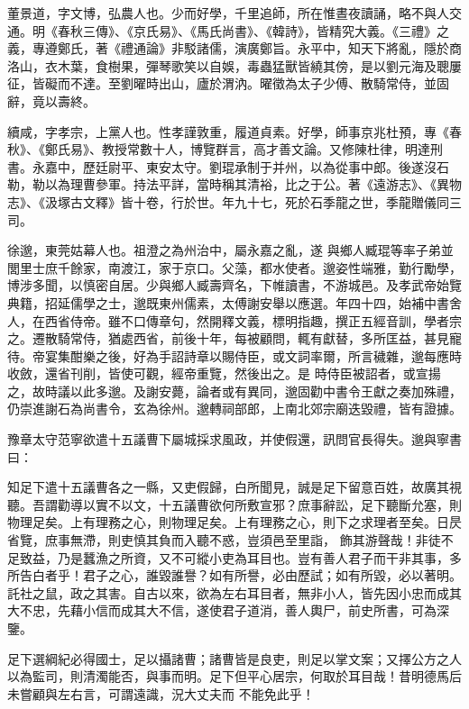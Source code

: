 \begin{pinyinscope}
 董景道，字文博，弘農人也。少而好學，千里追師，所在惟晝夜讀誦，略不與人交通。明《春秋三傳》、《京氏易》、《馬氏尚書》、《韓詩》，皆精究大義。《三禮》之義，專遵鄭氏，著《禮通論》非駁諸儒，演廣鄭旨。永平中，知天下將亂，隱於商洛山，衣木葉，食樹果，彈琴歌笑以自娛，毒蟲猛獸皆繞其傍，是以劉元海及聰屢征，皆礙而不達。至劉曜時出山，廬於渭汭。曜徵為太子少傅、散騎常侍，並固辭，竟以壽終。



 續咸，字孝宗，上黨人也。性孝謹敦重，履道貞素。好學，師事京兆杜預，專《春秋》、《鄭氏易》、教授常數十人，博覽群言，高才善文論。又修陳杜律，明達刑書。永嘉中，歷廷尉平、東安太守。劉琨承制于并州，以為從事中郎。後遂沒石勒，勒以為理曹參軍。持法平詳，當時稱其清裕，比之于公。著《遠游志》、《異物志》、《汲塚古文釋》皆十卷，行於世。年九十七，死於石季龍之世，季龍贈儀同三司。



 徐邈，東莞姑幕人也。祖澄之為州治中，屬永嘉之亂，遂
 與鄉人臧琨等率子弟並閭里士庶千餘家，南渡江，家于京口。父藻，都水使者。邈姿性端雅，勤行勵學，博涉多聞，以慎密自居。少與鄉人臧壽齊名，下帷讀書，不游城邑。及孝武帝始覽典籍，招延儒學之士，邈既東州儒素，太傅謝安舉以應選。年四十四，始補中書舍人，在西省侍帝。雖不口傳章句，然開釋文義，標明指趣，撰正五經音訓，學者宗之。遷散騎常侍，猶處西省，前後十年，每被顧問，輒有獻替，多所匡益，甚見寵待。帝宴集酣樂之後，好為手詔詩章以賜侍臣，或文詞率爾，所言穢雜，邈每應時收斂，還省刊削，皆使可觀，經帝重覽，然後出之。是
 時侍臣被詔者，或宣揚之，故時議以此多邈。及謝安薨，論者或有異同，邈固勸中書令王獻之奏加殊禮，仍崇進謝石為尚書令，玄為徐州。邈轉祠部郎，上南北郊宗廟迭毀禮，皆有證據。



 豫章太守范寧欲遣十五議曹下屬城採求風政，并使假還，訊問官長得失。邈與寧書曰：



 知足下遣十五議曹各之一縣，又吏假歸，白所聞見，誠是足下留意百姓，故廣其視聽。吾謂勸導以實不以文，十五議曹欲何所敷宣邪？庶事辭訟，足下聽斷允塞，則物理足矣。上有理務之心，則物理足矣。上有理務之心，則下之求理者至矣。日昃省覽，庶事無滯，則吏慎其負而入聽不惑，豈須邑至里詣，
 飾其游聲哉！非徒不足致益，乃是蠶漁之所資，又不可縱小吏為耳目也。豈有善人君子而干非其事，多所告白者乎！君子之心，誰毀誰譽？如有所譽，必由歷試；如有所毀，必以著明。託社之鼠，政之其害。自古以來，欲為左右耳目者，無非小人，皆先因小忠而成其大不忠，先藉小信而成其大不信，遂使君子道消，善人輿尸，前史所書，可為深鑒。



 足下選綱紀必得國士，足以攝諸曹；諸曹皆是良吏，則足以掌文案；又擇公方之人以為監司，則清濁能否，與事而明。足下但平心居宗，何取於耳目哉！昔明德馬后未嘗顧與左右言，可謂遠識，況大丈夫而
 不能免此乎！




\end{pinyinscope}
